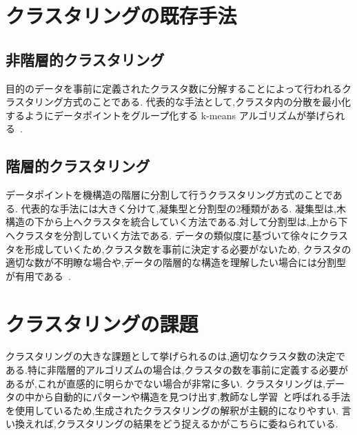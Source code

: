 \section{クラスタリングの既存手法}
\label{sec:rw_tech_sub}

\subsection{非階層的クラスタリング}
\label{subsec:rw_non_hierar}

目的のデータを事前に定義されたクラスタ数に分解することによって行われるクラスタリング方式のことである.
代表的な手法として,クラスタ内の分散を最小化するようにデータポイントをグループ化する k-means アルゴリズムが挙げられる~\cite{kurahashi2007k-means}.

\subsection{階層的クラスタリング}
\label{sebsec:rw_hierar}

データポイントを機構造の階層に分割して行うクラスタリング方式のことである.
代表的な手法には大きく分けて,凝集型と分割型の2種類がある.
凝集型は,木構造の下から上へクラスタを統合していく方法である.対して分割型は,上から下へクラスタを分割していく方法である.
データの類似度に基づいて徐々にクラスタを形成していくため,クラスタ数を事前に決定する必要がないため,
クラスタの適切な数が不明瞭な場合や,データの階層的な構造を理解したい場合には分割型が有用である~\cite{2023hierar}.

\section{クラスタリングの課題}
\label{sec:rw_prob}

クラスタリングの大きな課題として挙げられるのは,適切なクラスタ数の決定である.特に非階層的アルゴリズムの場合は,クラスタの数を事前に定義する必要があるが,これが直感的に明らかでない場合が非常に多い.
クラスタリングは,データの中から自動的にパターンや構造を見つけ出す,教師なし学習~\cite{unsupervised}と呼ばれる手法を使用しているため,生成されたクラスタリングの解釈が主観的になりやすい.
言い換えれば,クラスタリングの結果をどう捉えるかがこちらに委ねられている.
